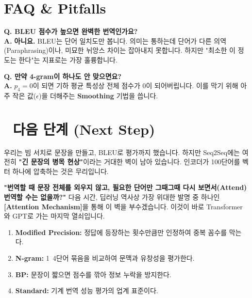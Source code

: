 \documentclass[11pt,a4paper]{book}
\theoremstyle{definition}
\begin{document}
\section{FAQ \& Pitfalls}

\textbf{Q. BLEU 점수가 높으면 완벽한 번역인가요?} \\
\textbf{A.} \textbf{아니요.} BLEU는 단어 일치도만 봅니다. 의미는 통하는데 단어가 다른 의역(Paraphrasing)이나, 미묘한 뉘앙스 차이는 잡아내지 못합니다. 하지만 "최소한 이 정도는 한다"는 지표로는 가장 훌륭합니다.

\textbf{Q. 만약 4-gram이 하나도 안 맞으면요?} \\
\textbf{A.} $p_4 = 0$이 되면 기하 평균 특성상 전체 점수가 0이 되어버립니다. 이를 막기 위해 아주 작은 값($\epsilon$)을 더해주는 \textbf{Smoothing} 기법을 씁니다.

\section*{🔗 다음 단계 (Next Step)}
우리는 빔 서치로 문장을 만들고, BLEU로 평가까지 했습니다. 하지만 Seq2Seq에는 여전히 \textbf{"긴 문장의 병목 현상"}이라는 거대한 벽이 남아 있습니다.
인코더가 100단어를 벡터 하나에 압축하는 것은 무리입니다.

\textbf{"번역할 때 문장 전체를 외우지 않고, 필요한 단어만 그때그때 다시 보면서(Attend) 번역할 수는 없을까?"}
다음 시간, 딥러닝 역사상 가장 위대한 발명 중 하나인 \textbf{[Attention Mechanism]}을 통해 이 벽을 부수겠습니다. 이것이 바로 Transformer와 GPT로 가는 마지막 열쇠입니다.

\vspace{0.5cm}

\begin{summarybox}[title={단원 요약 (Cheat Sheet)}]
\begin{enumerate}
    \item \textbf{Modified Precision:} 정답에 등장하는 횟수만큼만 인정하여 중복 꼼수를 막는다.
    \item \textbf{N-gram:} 1~4단어 묶음을 비교하여 문맥과 유창성을 평가한다.
    \item \textbf{BP:} 문장이 짧으면 점수를 깎아 정보 누락을 방지한다.
    \item \textbf{Standard:} 기계 번역 성능 평가의 업계 표준이다.
\end{enumerate}
\end{summarybox}


\end{document}
